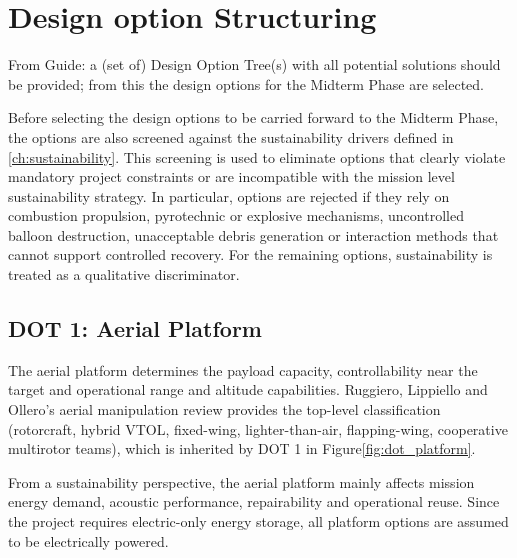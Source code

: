 

\chapter{Design option Structuring} \label{ch:Design Options}


From Guide: 
a (set of) Design Option Tree(s) with all potential solutions should be provided; from this the design options for the Midterm Phase are selected. 


Before selecting the design options to be carried forward to the Midterm Phase, the options are also screened against the sustainability drivers defined in \autoref{ch:sustainability}. This screening is used to eliminate options that clearly violate mandatory project constraints or are incompatible with the mission level sustainability strategy. In particular, options are rejected if they rely on combustion propulsion, pyrotechnic or explosive mechanisms, uncontrolled balloon destruction, unacceptable debris generation or interaction methods that cannot support controlled recovery. For the remaining options, sustainability is treated as a qualitative discriminator.





\section{DOT 1: Aerial Platform}
\label{sec:dot_platform}

The aerial platform determines the payload capacity,  controllability near the target and operational range and altitude capabilities. Ruggiero, Lippiello and Ollero's aerial manipulation review \cite{Ruggiero2018AerialReview} provides the top-level classification (rotorcraft, hybrid VTOL, fixed-wing, lighter-than-air, flapping-wing, cooperative multirotor teams), which is inherited by DOT 1 in Figure\ref{fig:dot_platform}.




From a sustainability perspective, the aerial platform mainly affects mission energy demand, acoustic performance, repairability and operational reuse. Since the project requires electric-only energy storage, all platform options are assumed to be electrically powered. 


